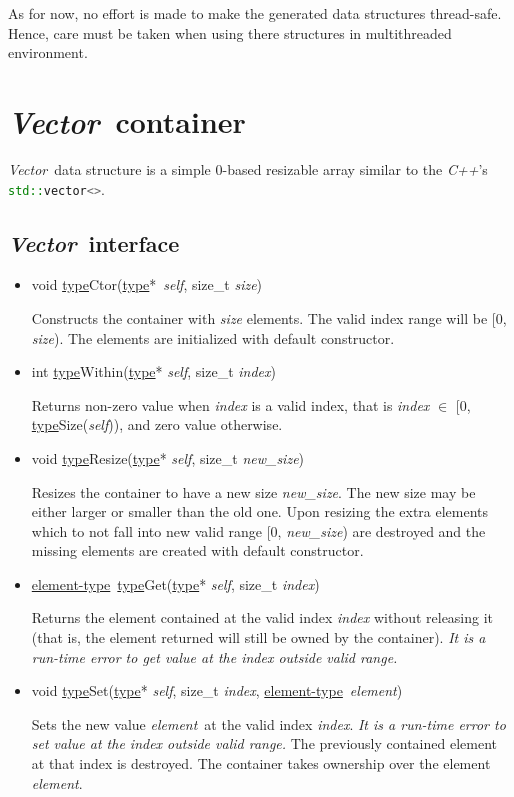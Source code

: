 \documentclass[a4paper]{article}
\newcommand{\Cpp}{\emph{C++}}
\newcommand{\st}{\underline{type}}
\newcommand{\et}{\underline{element-type}}
\newcommand{\sv}{\emph{self}}
\newcommand{\ev}{\emph{element}}
\newcommand{\meth}[1]{#1}
\begin{document}
As for now, no effort is made to make the generated data structures thread-safe.
Hence, care must be taken when using there structures in multithreaded environment.




\newcommand{\Vector}{\emph{Vector}}
\section{\Vector\ container}


\Vector\ data structure is a simple 0-based resizable array similar to the \Cpp's \lstinline[language=C++]{std::vector<>}.


\subsection{\Vector\ interface}


\begin{itemize}


\item \meth{void \st Ctor(\st*\ \sv, size\_t \emph{size})}


Constructs the container with \emph{size} elements.
The valid index range will be [0, \emph{size}).
The elements are initialized with default constructor.


\commonmethods


\item \meth{int \st Within(\st* \sv, size\_t \emph{index})}


Returns non-zero value when \emph{index} is a valid index, that is \emph{index} $\in$ [0, \meth{\st Size(\sv)}), and zero value otherwise.


\item \meth{void \st Resize(\st* \sv, size\_t \emph{new\_size})}


Resizes the container to have a new size \emph{new\_size}.
The new size may be either larger or smaller than the old one.
Upon resizing the extra elements which to not fall into new valid range [0, \emph{new\_size}) are destroyed and the missing elements are created with default constructor.


\item \meth{\et\ \st Get(\st* \sv, size\_t \emph{index})}


Returns the element contained at the valid index \emph{index} without releasing it (that is, the element returned will still be owned by the container).
\emph{It is a run-time error to get value at the index outside valid range.}


\item \meth{void \st Set(\st* \sv, size\_t \emph{index}, \et\ \ev)}


Sets the new value \ev\ at the valid index \emph{index}.
\emph{It is a run-time error to set value at the index outside valid range.}
The previously contained element at that index is destroyed.
The container takes ownership over the element \ev.


\end{itemize}
\end{document}
